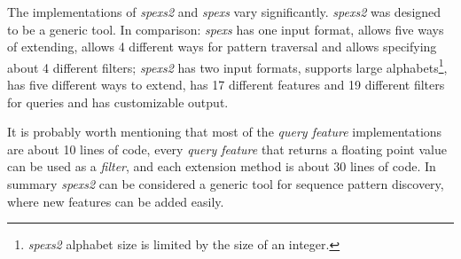 The implementations of \emph{spexs2} and \emph{spexs} vary significantly. \emph{spexs2} was designed to be a generic tool. In comparison: \emph{spexs} has one input format, allows five ways of extending, allows 4 different ways for pattern traversal and allows specifying about 4 different filters; \emph{spexs2} has two input formats, supports large alphabets\footnote{\emph{spexs2} alphabet size is limited by the size of an integer.}, has five different ways to extend, has 17 different features and 19 different filters for queries and has customizable output.

It is probably worth mentioning that most of the \emph{query feature} implementations are about 10 lines of code, every \emph{query feature} that returns a floating point value can be used as a \emph{filter}, and each extension method is about 30 lines of code. In summary \emph{spexs2} can be considered a generic tool for sequence pattern discovery, where new features can be added easily.